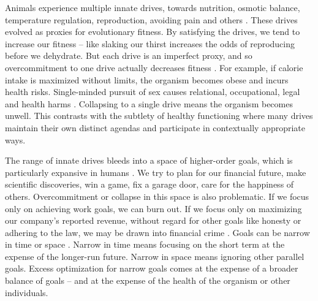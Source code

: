 \documentclass[12pt]{article}
\begin{document}
Animals experience multiple innate drives, towards nutrition, osmotic balance, temperature regulation, reproduction, avoiding pain and others \citep{saper2014hypothalamus, schulkin2019allostasis, sewards2003representations}. These drives evolved as proxies for evolutionary fitness. By satisfying the drives, we tend to increase our fitness -- like slaking our thirst increases the odds of reproducing before we dehydrate. But each drive is an imperfect proxy, and so overcommitment to one drive actually decreases fitness \citep{kurthnelson2024dynamic,john2023dead, williams1966adaptation, tooby1992psychological}. For example, if calorie intake is maximized without limits, the organism becomes obese and incurs health risks. Single-minded pursuit of sex causes relational, occupational, legal and health harms \citep{kraus2016should, carnes2001out}. Collapsing to a single drive means the organism becomes unwell. This contrasts with the subtlety of healthy functioning where many drives maintain their own distinct agendas and participate in contextually appropriate ways.

The range of innate drives bleeds into a space of higher-order goals, which is particularly expansive in humans \citep{maslow1943theory, miller1960plans, miller2001integrative, vallacher1987people, balleine2007role, cardinal2002emotion, frank2006anatomy, saunders2012role, o2014goal, schank1977scripts}. We try to plan for our financial future, make scientific discoveries, win a game, fix a garage door, care for the happiness of others. Overcommitment or collapse in this space is also problematic. If we focus only on achieving work goals, we can burn out. If we focus only on maximizing our company's reported revenue, without regard for other goals like honesty or adhering to the law, we may be drawn into financial crime \citep{campbell1979assessing, ordonez2009goals, kerr1975folly, burns2006impact}. Goals can be narrow in time or space \citep{ballard2018pursuit, vallacher1987people, shah2002forgetting, evenden1999varieties}. Narrow in time means focusing on the short term at the expense of the longer-run future. Narrow in space means ignoring other parallel goals. Excess optimization for narrow goals comes at the expense of a broader balance of goals -- and at the expense of the health of the organism or other individuals.
\end{document}
